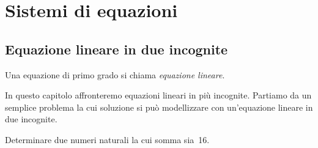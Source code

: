 


\chapter{Sistemi di equazioni}

\section{Equazione lineare in due incognite}
\label{sec:sist_eqdue}

\begin{definizione}{}{}
Una equazione di primo grado si chiama \emph{equazione lineare}.
\end{definizione}

In questo capitolo affronteremo equazioni lineari in più incognite. 
Partiamo da un semplice problema la cui soluzione si può modellizzare 
con un'equazione lineare in due incognite.

\begin{problema}{}{}
Determinare due numeri naturali la cui somma sia~16.
\end{problema}

